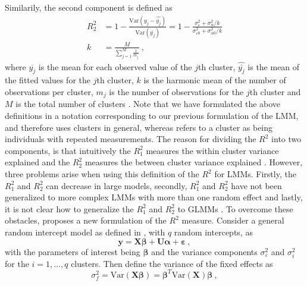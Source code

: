 Similarily, the second component is defined as
\begin{equation}
    \begin{aligned}
    R_2^2 &= 1-\frac{\text{Var} (y_{j} - \hat{\bar{y_{j}}})}{\text{Var} (\overline{y_{j}})} = 1-\frac{\sigma_{\varepsilon}^2 + \sigma^2_{\alpha}/k}{\sigma_{\varepsilon 0}^2 + \sigma^2_{\alpha 0}/k} \\
    k &= \frac{M}{\sum_{j=1}^M \frac{1}{m_j}} \ ,
    \end{aligned}
\end{equation}
where $\overline{y_j}$ is the mean for each observed value of the $j$th cluster, $\hat{\bar {y_j}}$ is the mean of the fitted values for the $j$th cluster, $k$ is the harmonic mean of the number of observations per cluster, $m_j$ is the number of observations for the $j$th cluster and $M$ is the total number of clusters \citep{nakagawa2013general}. 
Note that we have formulated the above definitions in a notation corresponding to our previous formulation of the LMM, and therefore uses clusters in general, whereas \citet{nakagawa2013general} refers to a cluster as being individuals with repeated measurements.
The reason for dividing the $R^2$ into two components, is that intuitively the $R^2_1$ measures the within cluster variance explained  and the $R^2_2$ measures the between cluster variance explained \citep{nakagawa2013general}.
However, three problems arise when using this definition of the $R^2$ for LMMs. 
Firstly, the $R^2_1$ and $R^2_2$ can decrease in large models, secondly, $R_1^2$ and $R_2^2$ have not been generalized to more complex LMMs with more than one random effect and lastly, it is not clear how to generalize the $R_1^2$ and $R_2^2$ to GLMMs \citep{nakagawa2013general}.
To overcome these obstacles, \citet{nakagawa2013general} proposes a new formulation of the $R^2$ measure. 
Consider a general random intercept model as defined in , with $q$ random intercepts, as
\begin{equation}
    \mathbf{y} = \mathbf{X}\boldsymbol{\beta} + \mathbf{U}\boldsymbol{\alpha} + \boldsymbol{\varepsilon} \ ,
\end{equation}
with the parameters of interest being $\boldsymbol{\beta}$ and the variance components $\sigma^2_{\varepsilon}$ and $\sigma^2_{i}$ for the $i=1, ..., q$ clusters.
Then define the variance of the fixed effects as 
\begin{equation}
    \sigma^2_f = \text{Var}(\mathbf{X}\boldsymbol{\beta}) = \boldsymbol{\beta}^T\text{Var}(\mathbf{X})\boldsymbol{\beta} \ ,
\end{equation}
